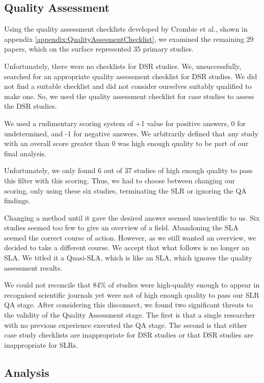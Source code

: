 \subsection{Quality Assessment}
Using the quality assessment checklists developed by Crombie et al.\cite{crombie1997pocket}, shown in appendix \ref{appendix:QualityAssesmentChecklist}, we examined the remaining 29 papers, which on the surface represented 35 primary studies.

Unfortunately, there were no checklists for DSR studies.
We, unsuccessfully, searched for an appropriate quality assessment checklist for DSR studies.
We did not find a suitable checklist and did not consider ourselves suitably qualified to make one.
So, we used the quality assessment checklist for case studies to assess the DSR studies.

We used a rudimentary scoring system of +1 value for positive answers, 0 for undetermined, and -1 for negative answers.
We arbitrarily defined that any study with an overall score greater than 0 was high enough quality to be part of our final analysis.

Unfortunately, we only found 6 out of 37 studies of high enough quality to pass this filter with this scoring.
Thus, we had to choose between changing our scoring, only using these six studies, terminating the SLR or ignoring the QA findings.

Changing a method until it gave the desired answer seemed unscientific to us.
Six studies seemed too few to give an overview of a field.
Abandoning the SLA seemed the correct course of action.
However, as we still wanted an overview, we decided to take a different course.
We accept that what follows is no longer an SLA. 
We titled it a Quasi-SLA, which is like an SLA, which ignores the quality assessment results.

We could not reconcile that 84\% of studies were high-quality enough to appear in recognised scientific journals yet were not of high enough quality to pass our SLR QA stage.
After considering this disconnect, we found two significant threats to the validity of the Quality Assessment stage.
The first is that a single researcher with no previous experience executed the QA stage.
The second is that either case study checklists are inappropriate for DSR studies or that DSR studies are inappropriate for SLRs.

\subsection{Analysis}
\label{section:slr_analysis}

